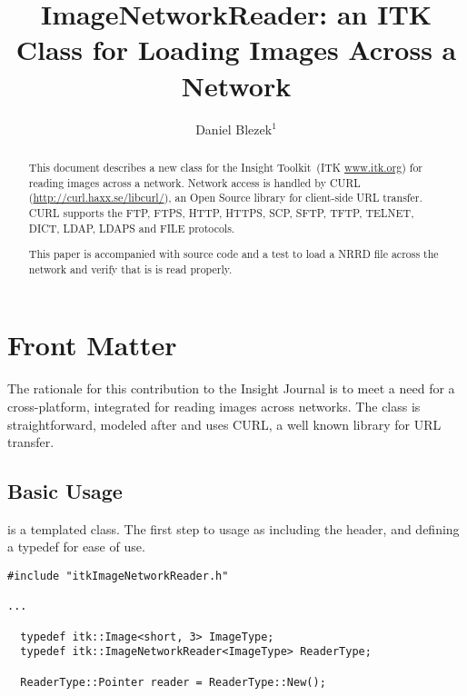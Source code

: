 \documentclass{InsightArticle}
\title{ImageNetworkReader: an ITK Class for Loading Images Across a Network}
\author{Daniel Blezek$^{1}$}
\newcommand{\IJhandlerIDnumber}{1338}
\begin{document}
%
% 
\IJhandlefooter{\IJhandlerIDnumber}


\maketitle


\ifhtml
\chapter*{Front Matter\label{front}}
\fi


\begin{abstract}
\noindent
This document describes a new class for the Insight Toolkit~(ITK \url{www.itk.org}) for reading images across a network.  Network access
is handled by CURL (\url{http://curl.haxx.se/libcurl/}), an Open Source library for client-side URL transfer.  CURL supports the FTP,
FTPS, HTTP, HTTPS, SCP, SFTP, TFTP, TELNET, DICT, LDAP, LDAPS and FILE protocols.

This paper is accompanied with source code and a test to load a NRRD file across the network and verify that is is read properly.

\end{abstract}

\IJhandlenote{\IJhandlerIDnumber}

\tableofcontents

The rationale for this contribution to the Insight Journal is to meet a need for a cross-platform, integrated  for reading
images across networks.  The class is straightforward, modeled after  and uses CURL, a well known library for URL transfer.

\section{Basic Usage}

 is a templated class.  The first step to usage as including the header, and defining a typedef for ease of use.

\begin{verbatim}
#include "itkImageNetworkReader.h"

...

  typedef itk::Image<short, 3> ImageType;
  typedef itk::ImageNetworkReader<ImageType> ReaderType;

  ReaderType::Pointer reader = ReaderType::New();
\end{verbatim}
\end{document}
